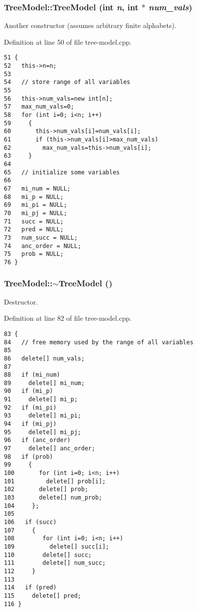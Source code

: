 \hypertarget{class_tree_model_c3f6a449478d5948af2b605f3dc99bb9}{
\subsubsection[TreeModel]{\setlength{\rightskip}{0pt plus 5cm}Tree\-Model::Tree\-Model (int {\em n}, int $\ast$ {\em num\_\-vals})}}
\label{class_tree_model_c3f6a449478d5948af2b605f3dc99bb9}


Another constructor (assumes arbitrary finite alphabets). 



Definition at line 50 of file tree-model.cpp.

\begin{Code}\begin{verbatim}51 {
52   this->n=n;
53 
54   // store range of all variables
55 
56   this->num_vals=new int[n];
57   max_num_vals=0;
58   for (int i=0; i<n; i++)
59     {
60       this->num_vals[i]=num_vals[i];
61       if (this->num_vals[i]>max_num_vals)
62         max_num_vals=this->num_vals[i];
63     }
64 
65   // initialize some variables
66 
67   mi_num = NULL;
68   mi_p = NULL;
69   mi_pi = NULL;
70   mi_pj = NULL;
71   succ = NULL;
72   pred = NULL;
73   num_succ = NULL;
74   anc_order = NULL;
75   prob = NULL;
76 }
\end{verbatim}\end{Code}


\hypertarget{class_tree_model_f0998d55a63c2b18be1f03e4e8567926}{
\subsubsection[$\sim$TreeModel]{\setlength{\rightskip}{0pt plus 5cm}Tree\-Model::$\sim$Tree\-Model ()}}
\label{class_tree_model_f0998d55a63c2b18be1f03e4e8567926}


Destructor. 



Definition at line 82 of file tree-model.cpp.

\begin{Code}\begin{verbatim}83 {
84   // free memory used by the range of all variables
85 
86   delete[] num_vals;
87 
88   if (mi_num)
89     delete[] mi_num;
90   if (mi_p)
91     delete[] mi_p;
92   if (mi_pi)
93     delete[] mi_pi;
94   if (mi_pj)
95     delete[] mi_pj;
96   if (anc_order)
97     delete[] anc_order;
98   if (prob)
99     {
100       for (int i=0; i<n; i++)
101         delete[] prob[i];
102       delete[] prob;
103       delete[] num_prob;
104     };
105 
106   if (succ)
107     {
108        for (int i=0; i<n; i++)
109          delete[] succ[i];
110        delete[] succ;
111        delete[] num_succ;
112     }
113 
114   if (pred)
115     delete[] pred; 
116 }
\end{verbatim}\end{Code}





